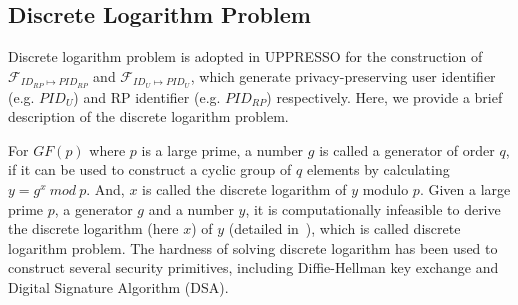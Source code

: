 \subsection{Discrete Logarithm Problem}
\label{sec:dlp}
Discrete logarithm problem is adopted in UPPRESSO for the construction of $\mathcal{F}_{ID_{RP} \mapsto PID_{RP}}$ and $\mathcal{F}_{ID_{U} \mapsto PID_{U}}$,
 which generate privacy-preserving user identifier (e.g. $PID_U$) and RP identifier (e.g. $PID_{RP}$) respectively.
Here, we provide a brief description of the discrete logarithm problem.

For $GF(p)$ where $p$ is a large prime, a number $g$ is called a generator of order $q$, if it can be used to construct a cyclic  group of $q$ elements by calculating $y=g^x \ mod\ p$.
And, $x$ is called the discrete logarithm of $y$ modulo $p$. Given a large prime $p$, a generator $g$ and a number $y$, it is computationally infeasible to derive the discrete logarithm (here $x$) of $y$ (detailed in~\cite{WXWM}), which is called discrete logarithm problem.
The hardness of solving discrete logarithm has been used to construct several security primitives, including Diffie-Hellman key exchange and Digital Signature Algorithm (DSA).




